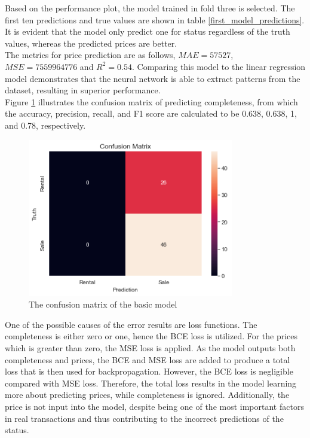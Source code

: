 \documentclass[12pt,twoside]{report}
\begin{document}
Based on the performance plot, the model trained in fold three is selected. The first ten predictions and true values are shown in table \ref{first_model_predictions}. It is evident that the model only predict one for status regardless of the truth values, whereas the predicted prices are better.  
\\

The metrics for price prediction are as follows, $MAE = 57527$, $MSE = 7559964776$ and $R^2 = 0.54$. Comparing this model to the linear regression model demonstrates that the neural network is able to extract patterns from the dataset, resulting in superior performance. 
\\

Figure \ref{confusion_matrix_basic_model} illustrates the confusion matrix of predicting completeness, from which the accuracy, precision, recall, and F1 score are calculated to be 0.638, 0.638, 1, and 0.78, respectively. 
\\

\begin{figure}[!htbp]
	\centering
	\includegraphics[width=9cm]{confusion_matrix_basic_model}
	\caption{The confusion matrix of the basic model}
	\label{confusion_matrix_basic_model}
\end{figure}

One of the possible causes of the error results are loss functions. The completeness is either zero or one, hence the BCE loss is utilized. For the prices which is greater than zero, the MSE loss is applied. As the model outputs both completeness and prices, the BCE and MSE loss are added to produce a total loss that is then used for backpropagation. However, the BCE loss is negligible compared with MSE loss. Therefore, the total loss results in the model learning more about predicting prices, while completeness is ignored. Additionally, the price is not input into the model, despite being one of the most important factors in real transactions and thus contributing to the incorrect predictions of the status.
\end{document}

